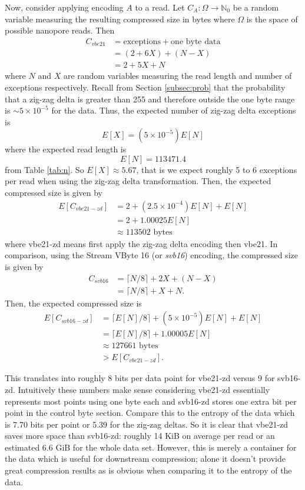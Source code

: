 Now, consider applying encoding $A$ to a read. Let $C_A:\Omega\to\mathbb{N}_0$
be a random variable measuring the resulting compressed size in bytes where
$\Omega$ is the space of possible nanopore reads. Then
\begin{align*}
	C_{vbe21} &= \text{exceptions} + \text{one byte data}\\
	&= (2 + 6X) + (N - X) \tag{$*$}\label{eq:vbe21}\\
	&= 2 + 5X + N
\end{align*}
where $N$ and $X$ are random variables measuring the read length and number of
exceptions respectively. Recall from Section \ref{subsec:prob} that the
probability that a zig-zag delta is greater than 255 and therefore outside the one
byte range is $\sim 5\times 10^{-5}$ for the data. Thus, the expected number of
zig-zag delta exceptions is
\[ E[X] = (5 \times 10^{-5})E[N] \]
where the expected read length is
\[ E[N] = 113471.4 \]
from Table \ref{tab:n}. So $E[X] \approx 5.67$, that is we expect roughly 5 to 6
exceptions per read when using the zig-zag delta transformation.
Then, the expected compressed size is given by
\begin{align*}
	E[C_{vbe21-zd}] &= 2 + (2.5\times 10^{-4})E[N]+ E[N]\\
	&= 2 + 1.00025E[N]\\
	&\approx 113502 \text{ bytes}
\end{align*}
where vbe21-zd means first apply the zig-zag delta encoding then vbe21. In
comparison, using the Stream VByte 16 (or \textit{svb16}) encoding, the
compressed size is given by
\begin{align*}
	C_{svb16} &= \lceil N/8 \rceil + 2X + (N - X)\\
	&= \lceil N/8 \rceil + X + N.
\end{align*}
Then, the expected compressed size is
\begin{align*}
	E[C_{svb16-zd}] &= \lceil E[N]/8 \rceil + (5 \times 10^{-5})E[N] + E[N]\\
	&= \lceil E[N]/8 \rceil + 1.00005E[N]\\
	&\approx 127661 \text{ bytes}\\
	&> E[C_{vbe21-zd}].
\end{align*}

This translates into roughly 8 bits per data point for vbe21-zd versus
9 for svb16-zd.
Intuitively these numbers make sense considering vbe21-zd essentially represents
most points using one byte each and svb16-zd stores one extra bit per point in
the control byte section.  Compare this to the entropy of the data which is 7.70
bits per point or 5.39 for the zig-zag deltas. So it is clear that
vbe21-zd saves more space than svb16-zd: roughly 14 KiB on average per read or
an estimated 6.6 GiB for the whole data set. However, this is merely a container
for the data which is useful for downstream compression; alone it doesn't
provide great compression results as is obvious when comparing it to the entropy
of the data.

